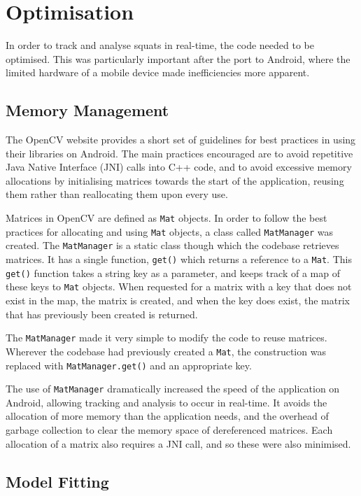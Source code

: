 \section{Optimisation}

In order to track and analyse squats in real-time, the code needed to be optimised. This was particularly important after the port to Android, where the limited hardware of a mobile device made inefficiencies more apparent.

\subsection{Memory Management}

The OpenCV website provides a short set of guidelines for best practices in using their libraries on Android\cite{opencvoptim}. The main practices encouraged are to avoid repetitive Java Native Interface (JNI) calls into C++ code, and to avoid excessive memory allocations by initialising matrices towards the start of the application, reusing them rather than reallocating them upon every use.

Matrices in OpenCV are defined as \texttt{Mat} objects. In order to follow the best practices for allocating and using \texttt{Mat} objects, a class called \texttt{MatManager} was created. The \texttt{MatManager} is a static class though which the codebase retrieves matrices. It has a single function, \texttt{get()} which returns a reference to a \texttt{Mat}. This \texttt{get()} function takes a string key as a parameter, and keeps track of a map of these keys to \texttt{Mat} objects. When requested for a matrix with a key that does not exist in the map, the matrix is created, and when the key does exist, the matrix that has previously been created is returned.

The \texttt{MatManager} made it very simple to modify the code to reuse matrices. Wherever the codebase had previously created a \texttt{Mat}, the construction was replaced with \texttt{MatManager.get()} and an appropriate key.

The use of \texttt{MatManager} dramatically increased the speed of the application on Android, allowing tracking and analysis to occur in real-time. It avoids the allocation of more memory than the application needs, and the overhead of garbage collection to clear the memory space of dereferenced matrices. Each allocation of a matrix also requires a JNI call, and so these were also minimised.

\subsection{Model Fitting}

